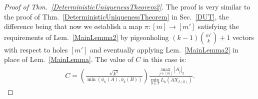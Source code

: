 \documentclass[journal, twocolumn]{IEEEtran}
\newtheorem{theorem}{Theorem}
\newtheorem{lemma}{Lemma}
\begin{document}
\begin{proof}[Proof of Thm.~\ref{DeterministicUniquenessTheorem2}]
The proof is very similar to the proof of Thm.~\ref{DeterministicUniquenessTheorem} in Sec.~\ref{DUT}, the difference being that now we establish a map $\pi: [m] \to [m']$ satisfying the requirements of Lem.~\ref{MainLemma2} by pigeonholing $(k-1){m' \choose k} + 1$ vectors with respect to holes $[m']$ and eventually applying Lem.~\ref{MainLemma2} in place of Lem.~\ref{MainLemma}. The value of $C$ in this case is:
\begin{align}\label{Cdef2}
C= \left( \frac{ \sqrt{k^3}}{ \min(\phi_k(A), \phi_k(B)) } \right) \frac{\max_{j \in [m]} |A_j|_2}{\min_{S \in T} L_k(AX_{I(S)})}.
\end{align}
\end{proof}






\end{document}
